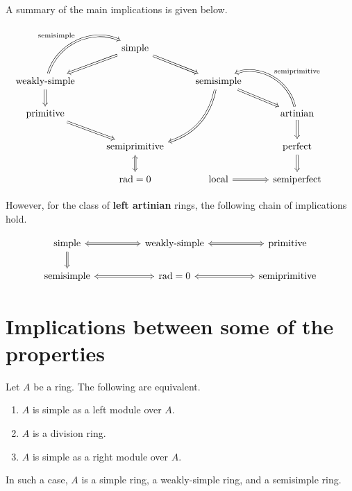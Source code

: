 \documentclass[12pt]{article}
\begin{document}
A summary of the main implications is given below.

\begin{equation*} 
	\begin{tikzcd}
	 & \text{simple} \arrow[ld, Rightarrow] \arrow[rd, Rightarrow] && \\
	\text{weakly-simple} \arrow[ru, Rightarrow, "\text{semisimple}", bend left=49] \arrow[d, Rightarrow] && \text{semisimple} \arrow[ldd, Rightarrow, bend left] \arrow[rd, Rightarrow] & \\
	\text{primitive} \arrow[rd, Rightarrow]  & & & \text{artinian} \arrow[lu, "\text{semiprimitive}"', Rightarrow, bend right=49] \arrow[d, Rightarrow] & \\
 & \text{semiprimitive} \arrow[d, Leftrightarrow]  &  & \text{perfect} \arrow[d, Rightarrow] \\
 & \rad = 0 & \text{local} \arrow[r, Rightarrow] & \text{semiperfect}  &
	\end{tikzcd}
\end{equation*}

\newcommand{\artinianimplications}[1]{%
\begin{equation*} 
	\begin{tikzcd}[ampersand replacement = \&, background color=#1]
		\text{simple} \arrow[rr, Leftrightarrow] \arrow[d, Rightarrow] \&  \& \text{weakly-simple} \arrow[rr, Leftrightarrow] \&  \& \text{primitive} \\
	\text{semisimple} \arrow[rr, Leftrightarrow]  \&  \& \rad = 0 \arrow[rr, Leftrightarrow] \& \& \text{semiprimitive}
	\end{tikzcd}	
\end{equation*}
}

However, for the class of \textbf{{\color{red}left artinian}} rings, the following chain of implications hold.

\artinianimplications{white}

\section{Implications between some of the properties}

\begin{thm} \label{thm:simple-as-a-module}
	Let $A$ be a ring. The following are equivalent.
	\begin{enumerate}[label=(\alph*)]
		\item $A$ is simple as a left module over $A$.
		\item $A$ is a division ring.
		\item $A$ is simple as a right module over $A$.
	\end{enumerate}
	In such a case, $A$ is a simple ring, a weakly-simple ring, and a semisimple ring.
\end{thm}
\end{document}
